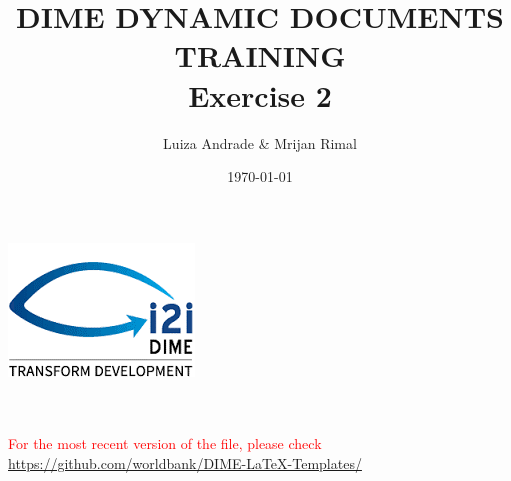 \documentclass[12pts]{article}
\title{DIME DYNAMIC DOCUMENTS TRAINING \\ Exercise 2}
\author{Luiza Andrade \& Mrijan Rimal}
\date{\today}
\begin{document}
	
	
	\makeatletter
	\begin{titlepage}
		\begin{center}
			\includegraphics[width=0.3\linewidth]{../img/i2i.png}\\[10ex]
			{\LARGE \bfseries  \@title }\\[2ex] 
			{\Large  \@author}\\[20ex] 
			{\large \@date}
		\end{center}
	\textcolor{red}{For the most recent version of the file, please check \url{https://github.com/worldbank/DIME-LaTeX-Templates/}}
	\end{titlepage}
	\makeatother
	
	\tableofcontents
	
\end{document}
